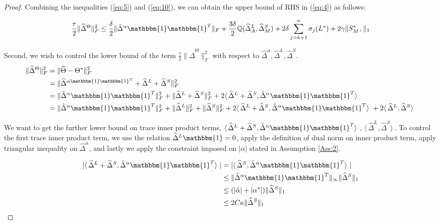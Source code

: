\documentclass[AMS,STIX1COL]{WileyNJD-v2}
\begin{document}
{\begin{proof}
Combining the inequalities (\ref{eq:5}) and (\ref{eq:10}), we can obtain the upper bound of RHS in (\ref{eq:4}) as follows:

\begin{equation}
    \frac{\tau}{2}\|\widehat{\Delta}^{\Theta}\|_{F}^{2} \leq
    \frac{\delta}{2}\|\hat{\Delta}^{\alpha}\mathbbm{1}\mathbbm{1}^T\|_{F} +
    \frac{3\delta}{2}\mathbb{Q}(\widehat{\Delta}^L_{A},\widehat{\Delta}^S_{M})
    +2 \delta \sum_{j=k+1}^{n} \sigma_{j}(L^*) + 2\gamma \|S^*_{M^\perp}\|_{1}
    \label{eq:11}
\end{equation}

Second, we wish to control the lower bound of the term  $\frac{\tau}{2}\|\widehat{\Delta}^{\Theta}\|_{F}^{2}$ with respect to $\hat{\Delta}^{\alpha},\widehat{\Delta}^{L},\widehat{\Delta}^{S}$.
\begin{align}
\|\widehat{\Delta}^{\Theta}\|_{F}^{2}  \nonumber
&= \|\widehat{\Theta}-\Theta^{*} \|_{F}^{2} \\ \nonumber
&= \|\widehat\Delta^{\alpha\mathbbm{1}\mathbbm{1}^T} + \widehat\Delta^{L} + \widehat\Delta^{S}\|_{F}^{2} \\ \nonumber
&= \|\hat{\Delta}^{\alpha}\mathbbm{1}\mathbbm{1}^T\|_{F}^{2} + \|\widehat{\Delta}^{L}+\widehat{\Delta}^{S}\|_{F}^{2} +
2 \langle\, \widehat\Delta^{L} + \widehat\Delta^{S} ,\hat{\Delta}^{\alpha}\mathbbm{1}\mathbbm{1}^T \rangle\ \\
&=  \|\hat{\Delta}^{\alpha}\mathbbm{1}\mathbbm{1}^T\|_{F}^{2} + \|\widehat{\Delta}^{L}\|_{F}^{2} + \|\widehat{\Delta}^{S}\|_{F}^{2} +
2 \langle\, \widehat\Delta^{L} + \widehat\Delta^{S} ,\hat{\Delta}^{\alpha}\mathbbm{1}\mathbbm{1}^T \rangle\ +
2 \langle\, \widehat\Delta^{L}, \widehat\Delta^{S} \rangle\  \label{eq:12}
\end{align}

We want to get the further lower bound on trace inner product terms,
$ \langle\, \widehat\Delta^{L} + \widehat\Delta^{S} ,\hat{\Delta}^{\alpha}\mathbbm{1}\mathbbm{1}^T \rangle\ $, $ \langle\, \widehat\Delta^{L}, \widehat\Delta^{S} \rangle\ $. To control the first trace inner product term, we use the relation $\widehat{\Delta}^{L}\mathbbm{1}=0$, apply the definition of dual norm on inner product term, apply triangular inequality on $\hat{\Delta}^\alpha$, and lastly we apply the constraint imposed on $|\alpha|$ stated in Assumption \ref{Ass:2}.

\begin{align}
    | \langle\, \widehat\Delta^{L} + \widehat\Delta^{S} ,\hat{\Delta}^{\alpha}\mathbbm{1}\mathbbm{1}^T\rangle\ | \nonumber
    &= | \langle\,\widehat\Delta^{S},\hat{\Delta}^{\alpha}\mathbbm{1}\mathbbm{1}^T\rangle\ | \\ \nonumber
    &\leq \|\hat{\Delta}^{\alpha}\mathbbm{1}\mathbbm{1}^T \|_{\infty} \|\widehat{\Delta}^{S}\|_1 \\ \nonumber
    &\leq (|\hat{\alpha}|+|\alpha^{*}|)\|\widehat{\Delta}^{S}\|_1\\
    &\leq 2C\kappa\|\widehat{\Delta}^{S}\|_1  \label{eq:13}
\end{align}


\end{proof}}
\end{document}
